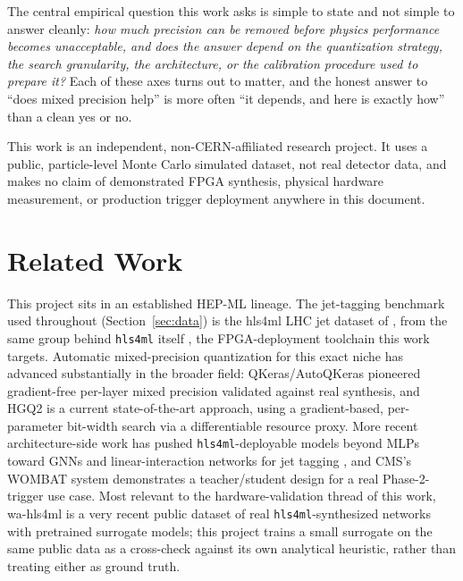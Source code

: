 \documentclass[11pt]{article}
\begin{document}
The central empirical question this work asks is simple to state and not simple to answer cleanly:
\emph{how much precision can be removed before physics performance becomes unacceptable, and does the
answer depend on the quantization strategy, the search granularity, the architecture, or the
calibration procedure used to prepare it?} Each of these axes turns out to matter, and the honest
answer to ``does mixed precision help'' is more often ``it depends, and here is exactly how'' than a
clean yes or no.

This work is an independent, non-CERN-affiliated research project. It uses a public, particle-level
Monte Carlo simulated dataset, not real detector data, and makes no claim of demonstrated FPGA
synthesis, physical hardware measurement, or production trigger deployment anywhere in this document.

\section{Related Work}

This project sits in an established HEP-ML lineage. The jet-tagging benchmark used throughout
(Section~\ref{sec:data}) is the hls4ml LHC jet dataset of \citet{duarte2018fast}, from the same group
behind \texttt{hls4ml} itself \citep{hls4ml}, the FPGA-deployment toolchain this work targets.
Automatic mixed-precision quantization for this exact niche has advanced substantially in the broader
field: QKeras/AutoQKeras \citep{coelho2021automatic} pioneered gradient-free per-layer mixed precision
validated against real synthesis, and HGQ2 \citep{sun2024hgq} is a current state-of-the-art approach,
using a gradient-based, per-parameter bit-width search via a differentiable resource proxy. More
recent architecture-side work has pushed \texttt{hls4ml}-deployable models beyond MLPs toward GNNs and
linear-interaction networks for jet tagging \citep{sun2025jedilinear,moreno2020jedinet}, and CMS's
WOMBAT system \citep{moreno2025wombat} demonstrates a teacher/student design for a real Phase-2-trigger
use case. Most relevant to the hardware-validation thread of this work, wa-hls4ml
\citep{hawks2025wahls4ml} is a very recent public dataset of real \texttt{hls4ml}-synthesized networks
with pretrained surrogate models; this project trains a small surrogate on the same public data as a
cross-check against its own analytical heuristic, rather than treating either as ground truth.
\end{document}
